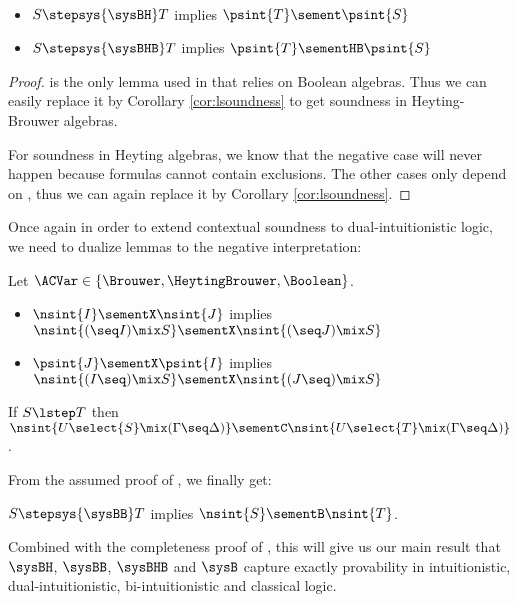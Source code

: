 \begin{corollary}\label{cor:soundness}
  ~\\\vspace{-1em}
  \begin{itemize}
    \item $S \stepsys{\sysBH} T$ implies $\psint{T} \sement \psint{S}$
    \item $S \stepsys{\sysBHB} T$ implies $\psint{T} \sementHB \psint{S}$
  \end{itemize}
\end{corollary}
\begin{proof}
   is the only lemma used in
   that relies on Boolean algebras. Thus we can
  easily replace it by Corollary \ref{cor:lsoundness} to get soundness in Heyting-Brouwer
  algebras.

  For soundness in Heyting algebras, we know that the negative case will never
  happen because formulas cannot contain exclusions. The other cases only depend
  on , thus we can again replace it by
  Corollary \ref{cor:lsoundness}.
\end{proof}

Once again in order to extend contextual soundness to dual-intuitionistic logic,
we need to dualize lemmas to the negative interpretation:

\begin{lemma}[Co-functoriality]
  Let $\ACVar \in \{\Brouwer, \HeytingBrouwer, \Boolean\}$.
  ~\\\vspace{-1em}
  \begin{itemize}
    \item $\nsint{I} \sementX \nsint{J}$ implies $\nsint{(\seq I) \mix S}
    \sementX \nsint{(\seq J) \mix S}$
    \item $\psint{J} \sementX \psint{I}$ implies $\nsint{(I \seq) \mix S}
    \sementX \nsint{(J \seq) \mix S}$
  \end{itemize}
\end{lemma}

\begin{lemma}
  If $S \lstep T$ then $\nsint{U\select{S} \mix (\Gamma \seq \Delta)} \sementC
  \nsint{U\select{T} \mix (\Gamma \seq \Delta)}$.
\end{lemma}

From the assumed proof of , we finally get:

\begin{corollary}\label{cor:cosoundness}
  $S \stepsys{\sysBB} T$ implies $\nsint{S} \sementB \nsint{T}$.
\end{corollary}

Combined with the completeness proof of , this will
give us our main result that $\sysBH$, $\sysBB$, $\sysBHB$ and $\sysB$ capture
exactly provability in intuitionistic, dual-intuitionistic, bi-intuitionistic
and classical logic.